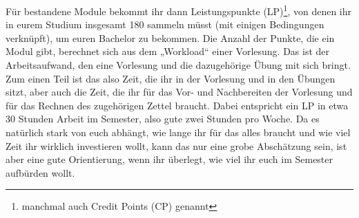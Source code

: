 Für bestandene Module bekommt ihr dann Leistungspunkte (LP)\footnote{manchmal auch Credit Points (CP) genannt}, von denen ihr in eurem Studium insgesamt 180 sammeln müsst (mit einigen Bedingungen verknüpft), um euren Bachelor zu bekommen. Die Anzahl der Punkte, die ein Modul gibt, berechnet sich aus dem „Workload“ einer Vorlesung. Das ist der Arbeitsaufwand, den eine Vorlesung und die dazugehörige Übung mit sich bringt. Zum einen Teil ist das also Zeit, die ihr in der Vorlesung und in den Übungen sitzt, aber auch die Zeit, die ihr für das Vor- und Nachbereiten der Vorlesung und für das Rechnen des zugehörigen Zettel braucht. Dabei entspricht ein LP in etwa 30 Stunden Arbeit im Semester, also gute zwei Stunden pro Woche. Da es natürlich stark von euch abhängt, wie lange ihr für das alles braucht und wie viel Zeit ihr wirklich investieren wollt, kann das nur eine grobe Abschätzung sein, ist aber eine gute Orientierung, wenn ihr überlegt, wie viel ihr euch im Semester aufbürden wollt.

